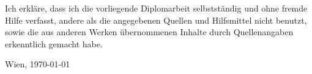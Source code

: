 Ich erkläre, dass ich die vorliegende Diplomarbeit selbstständig und ohne fremde Hilfe verfasst, andere als die angegebenen Quellen und Hilfsmittel nicht benutzt, sowie die aus anderen Werken übernommenen Inhalte durch Quellenangaben erkenntlich gemacht habe.

Wien, \today

